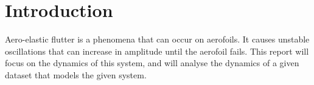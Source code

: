 \section{Introduction}

Aero-elastic flutter is a phenomena that can occur on aerofoils. It causes unstable oscillations that can increase in amplitude until the aerofoil fails. 
This report will focus on the dynamics of this system, and will analyse the dynamics of a given dataset that models the given system. 
